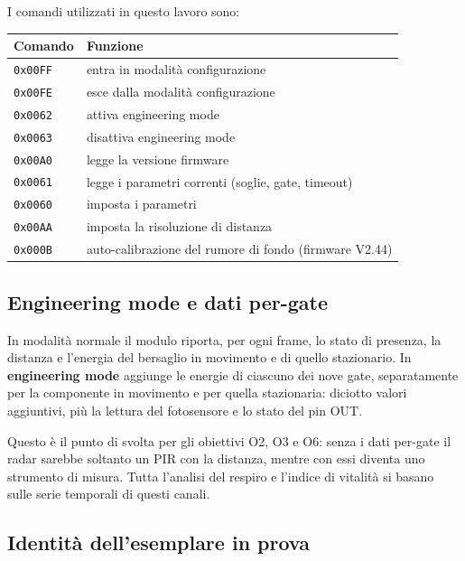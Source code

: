 I comandi utilizzati in questo lavoro sono:

\begin{center}\small
\begin{tabular}{@{}ll@{}}
\toprule
\textbf{Comando} & \textbf{Funzione} \\
\midrule
\texttt{0x00FF} & entra in modalità configurazione \\
\texttt{0x00FE} & esce dalla modalità configurazione \\
\texttt{0x0062} & attiva engineering mode \\
\texttt{0x0063} & disattiva engineering mode \\
\texttt{0x00A0} & legge la versione firmware \\
\texttt{0x0061} & legge i parametri correnti (soglie, gate, timeout) \\
\texttt{0x0060} & imposta i parametri \\
\texttt{0x00AA} & imposta la risoluzione di distanza \\
\texttt{0x000B} & auto-calibrazione del rumore di fondo (firmware V2.44) \\
\bottomrule
\end{tabular}
\end{center}

\subsection{Engineering mode e dati per-gate}
\label{sec:engineering}

In modalità normale il modulo riporta, per ogni frame, lo stato di presenza, la
distanza e l'energia del bersaglio in movimento e di quello stazionario. In
\textbf{engineering mode} aggiunge le energie di ciascuno dei nove gate,
separatamente per la componente in movimento e per quella stazionaria: diciotto
valori aggiuntivi, più la lettura del fotosensore e lo stato del pin OUT.

Questo è il punto di svolta per gli obiettivi O2, O3 e O6: senza i dati per-gate
il radar sarebbe soltanto un PIR con la distanza, mentre con essi diventa uno
strumento di misura. Tutta l'analisi del respiro e l'indice di vitalità si basano
sulle serie temporali di questi canali.

\subsection{Identità dell'esemplare in prova}
\label{sec:identita}

